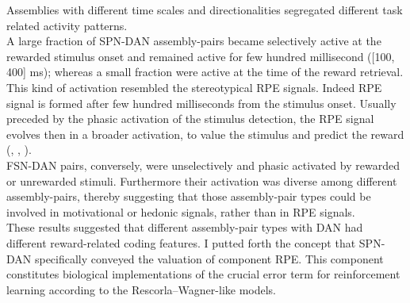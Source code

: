 \begin{itemize}
    Assemblies with different time scales and directionalities segregated different task related activity patterns.\\A large fraction of SPN-DAN assembly-pairs became selectively active at the rewarded stimulus onset and remained active for few hundred millisecond ([100, 400] ms); whereas a small fraction were active at the time of the reward retrieval. This kind of activation resembled the stereotypical RPE signals. Indeed RPE signal is formed after few hundred milliseconds from the stimulus onset. Usually preceded by the phasic activation of the stimulus detection, the RPE signal evolves then in a broader activation, to value the stimulus and predict the reward (\cite{Tobler2003}, \cite{Nomoto2010}, \cite{Schultz2016}).\\%
    FSN-DAN pairs, conversely, were unselectively and phasic activated by rewarded or unrewarded stimuli. Furthermore their activation was diverse among different assembly-pairs, thereby suggesting that those assembly-pair types could be involved in motivational or hedonic signals, rather than in RPE signals.\\These results suggested that different assembly-pair types with DAN had different reward-related coding features. I putted forth the concept that SPN-DAN specifically conveyed the valuation of component RPE. This component constitutes biological implementations of the crucial error term for reinforcement learning according to the Rescorla–Wagner-like models. 

\end{itemize}
